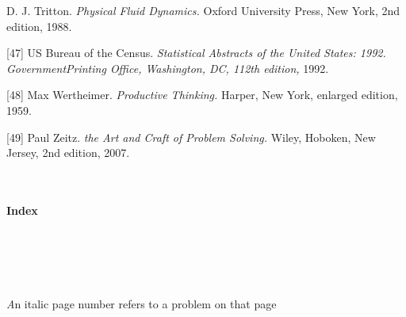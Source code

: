 \documentclass[b5paper]{article}
\begin{document}
\begin{flushleft}
[46] D. J. Tritton.\emph{ Physical Fluid Dynamics.} Oxford University Press, New York, 2nd
edition, 1988.

[47] US Bureau of the Census.\emph{ Statistical Abstracts of the United States: 1992. GovernmentPrinting Office, Washington, DC, 112th edition,} 1992.

[48] Max Wertheimer.\emph{ Productive Thinking. }Harper, New York, enlarged edition, 1959.

[49] Paul Zeitz. \emph{ the Art and Craft of Problem Solving.} Wiley, Hoboken, New Jersey, 2nd edition, 2007.
\end{flushleft}

\newpage
\mbox{}
\newpage
~\\~\\
 \Huge\textbf{Index}
~\\~\\
~\\~\\~\\
~\\
\normalsize\emph An italic page number refers to a problem on that page~\\~\\
\setlength{\columnsep}{1cm}
\end{document}
